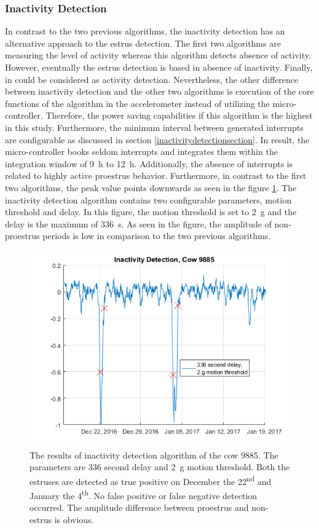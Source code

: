\documentclass[english,12pt,a4paper,pdftex,elec,utf8]{aaltothesis}
\begin{document}
\subsubsection{Inactivity Detection}\label{inactivitydetectionevaluation}

In contrast to the two previous algorithms, the inactivity detection has an alternative approach to the estrus detection. The first two algorithms are measuring the level of activity whereas this algorithm detects absence of activity. However, eventually the estrus detection is based in absence of inactivity. Finally, in could be considered as activity detection. Nevertheless, the other difference between inactivity detection and the other two algorithms is execution of the core functions of the algorithm in the accelerometer instead of utilizing the micro-controller. Therefore, the power saving capabilities if this algorithm is the highest in this study. Furthermore, the minimum interval between generated interrupts are configurable as discussed in section \ref{inactivitydetectionsection}. In result, the micro-controller books seldom interrupts and integrates them within the integration window of \SI{9}{\hour} to \SI{12}{\hour}. Additionally, the absence of interrupts is related to highly active proestrus behavior. Furthermore, in contrast to the first two algorithms, the peak value points downwards as seen in the figure \ref{InactivityDetectionCow9885}. The inactivity detection algorithm contains two configurable parameters, motion threshold and delay. In this figure, the motion threshold is set to \SI{2}{\gram} and the delay is the maximum of \SI{336}{s}. As seen in the figure, the amplitude of non-proestrus periods is low in comparison to the two previous algorithms.


\begin{figure}[htb]
\centering
\includegraphics[width = 0.75 \textwidth]{figures/InactivityDetectionCow9885.png}
\caption{The results of inactivity detection algorithm of the cow 9885. The parameters are 336 second delay and \SI{2}{\gram} motion threshold. Both the estruses are detected as true positive on December the 22\textsuperscript{nd} and January the 4\textsuperscript{th}. No false positive or false negative detection occurred. The amplitude difference between proestrus and non-estrus is obvious.}
\label{InactivityDetectionCow9885}
\end{figure}
\end{document}
